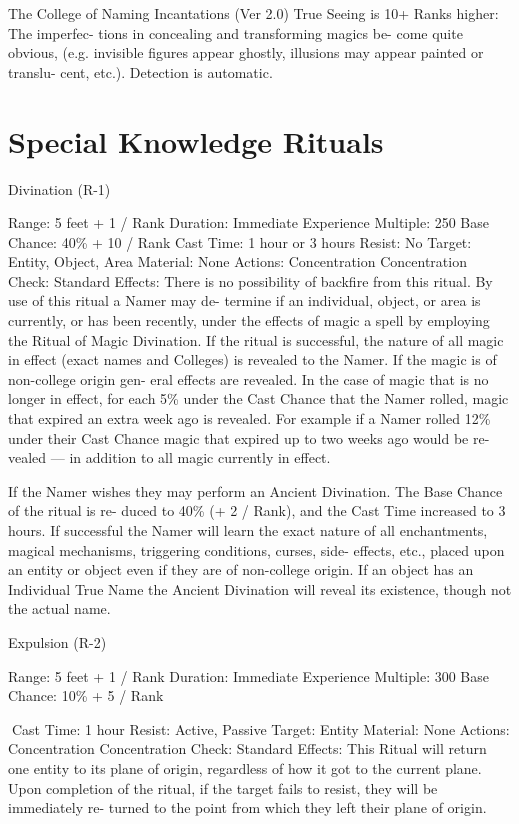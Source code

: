 \begin{Chapter}{The College of Naming Incantations (Ver 2.0)}
True Seeing is 10+ Ranks higher: The imperfec-
tions  in  concealing  and  transforming  magics  be-
come  quite  obvious,  (e.g.  invisible  figures  appear 
ghostly,  illusions  may  appear  painted  or  translu-
cent, etc.). Detection is automatic. 


\section{Special Knowledge Rituals}

Divination (R-1) 

Range: 5 feet + 1 / Rank 
Duration: Immediate 
Experience Multiple: 250 
Base Chance: 40\% + 10 / Rank 
Cast Time: 1 hour or 3 hours 
Resist: No 
Target: Entity, Object, Area 
Material: None 
Actions: Concentration 
Concentration Check: Standard 
Effects:  There  is  no  possibility  of  backfire  from 
this  ritual.  By  use  of  this  ritual  a  Namer  may  de-
termine if an individual, object, or area is currently, 
or  has  been  recently,  under  the  effects  of  magic  a 
spell by employing the Ritual of Magic Divination. 
If the ritual is successful, the nature of all magic in 
effect (exact names and Colleges) is revealed to the 
Namer.  If  the  magic  is  of  non-college  origin  gen-
eral  effects  are  revealed.  In  the  case  of  magic  that 
is  no  longer  in  effect,  for  each  5\%  under  the  Cast 
Chance  that  the  Namer  rolled,  magic  that  expired 
an  extra  week  ago  is  revealed.  For  example  if  a 
Namer  rolled  12\%  under  their  Cast  Chance  magic 
that  expired  up  to  two  weeks  ago  would  be  re-
vealed  —  in  addition  to  all  magic  currently  in 
effect. 

If the Namer wishes they may perform an Ancient 
Divination.  The  Base  Chance  of  the  ritual  is  re-
duced  to  40\%  (+  2  /  Rank),  and  the  Cast  Time 
increased  to  3  hours.  If  successful  the  Namer  will 
learn the exact nature of all enchantments, magical 
mechanisms,  triggering  conditions,  curses,  side-
effects, etc., placed upon an entity or object even if 
they  are  of  non-college  origin.  If  an  object  has  an 
Individual  True  Name  the  Ancient  Divination  will 
reveal its existence, though not the actual name. 

Expulsion (R-2) 

Range: 5 feet + 1 / Rank 
Duration: Immediate 
Experience Multiple: 300 
Base Chance: 10\% + 5 / Rank 

Cast Time: 1 hour 
Resist: Active, Passive 
Target: Entity 
Material: None 
Actions: Concentration 
Concentration Check: Standard 
Effects:  This  Ritual  will  return  one  entity  to  its 
plane  of  origin,  regardless  of  how  it  got  to  the 
current plane. Upon completion of the ritual, if the 
target  fails  to  resist,  they  will  be  immediately  re-
turned to the point from which they left their plane 
of origin. 


\end{Chapter}
